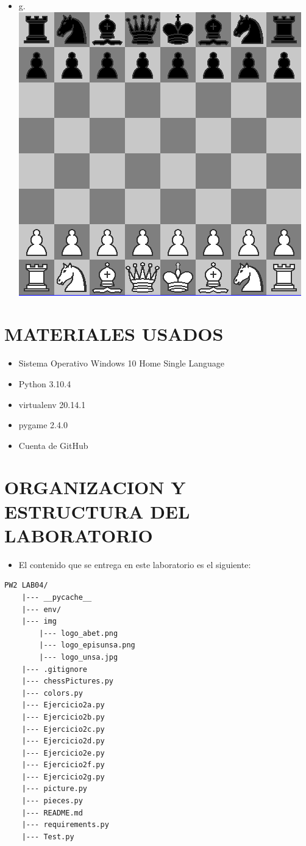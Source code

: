 \documentclass{article}
\begin{document}
\begin{itemize}
    \item g.\\ \includegraphics{img/ejercicio_02_g.png} 
\end{itemize}

\section{MATERIALES USADOS}

\begin{itemize}
    \item Sistema Operativo Windows 10 Home Single Language
    \item Python 3.10.4
    \item virtualenv 20.14.1
    \item pygame 2.4.0
    \item Cuenta de GitHub
\end{itemize}

\section{ORGANIZACION Y ESTRUCTURA DEL LABORATORIO}
\begin{itemize}	
		\item El contenido que se entrega en este laboratorio es el siguiente:
\end{itemize}
 
\begin{lstlisting}[style=ascii-tree]
PW2 LAB04/
    |--- __pycache__
    |--- env/
    |--- img
        |--- logo_abet.png
        |--- logo_episunsa.png
        |--- logo_unsa.jpg
    |--- .gitignore
    |--- chessPictures.py    
    |--- colors.py    
    |--- Ejercicio2a.py
    |--- Ejercicio2b.py
    |--- Ejercicio2c.py
    |--- Ejercicio2d.py
    |--- Ejercicio2e.py
    |--- Ejercicio2f.py
    |--- Ejercicio2g.py
    |--- picture.py
    |--- pieces.py
    |--- README.md
    |--- requirements.py
    |--- Test.py

\end{lstlisting}    
\end{document}
